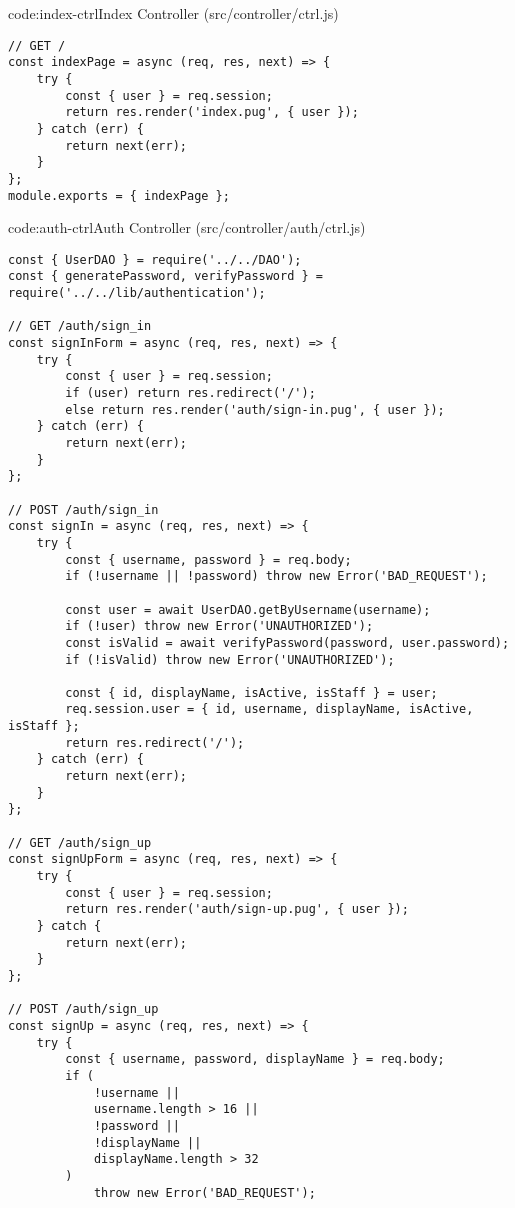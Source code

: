 \begin{code}{code:index-ctrl}{Index Controller (src/controller/ctrl.js)}
\begin{verbatim}
// GET /
const indexPage = async (req, res, next) => {
    try {
        const { user } = req.session;
        return res.render('index.pug', { user });
    } catch (err) {
        return next(err);
    }
};
module.exports = { indexPage };
\end{verbatim}
\end{code}

\begin{code}{code:auth-ctrl}{Auth Controller (src/controller/auth/ctrl.js)}
\begin{verbatim}
const { UserDAO } = require('../../DAO');
const { generatePassword, verifyPassword } = require('../../lib/authentication');

// GET /auth/sign_in
const signInForm = async (req, res, next) => {
    try {
        const { user } = req.session;
        if (user) return res.redirect('/');
        else return res.render('auth/sign-in.pug', { user });
    } catch (err) {
        return next(err);
    }
};

// POST /auth/sign_in
const signIn = async (req, res, next) => {
    try {
        const { username, password } = req.body;
        if (!username || !password) throw new Error('BAD_REQUEST');

        const user = await UserDAO.getByUsername(username);
        if (!user) throw new Error('UNAUTHORIZED');
        const isValid = await verifyPassword(password, user.password);
        if (!isValid) throw new Error('UNAUTHORIZED');

        const { id, displayName, isActive, isStaff } = user;
        req.session.user = { id, username, displayName, isActive, isStaff };
        return res.redirect('/');
    } catch (err) {
        return next(err);
    }
};

// GET /auth/sign_up
const signUpForm = async (req, res, next) => {
    try {
        const { user } = req.session;
        return res.render('auth/sign-up.pug', { user });
    } catch {
        return next(err);
    }
};

// POST /auth/sign_up
const signUp = async (req, res, next) => {
    try {
        const { username, password, displayName } = req.body;
        if (
            !username ||
            username.length > 16 ||
            !password ||
            !displayName ||
            displayName.length > 32
        )
            throw new Error('BAD_REQUEST');


\end{verbatim}
\end{code}
